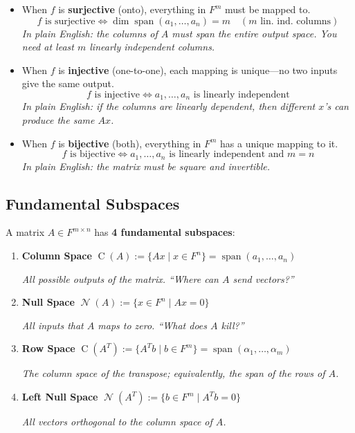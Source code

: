 \documentclass[11pt]{article}
\theoremstyle{definition}
\theoremstyle{plain}
\theoremstyle{remark}
\DeclareMathOperator{\spn}{span}
\DeclareMathOperator{\Null}{\mathcal{N}}
\DeclareMathOperator{\Col}{C}
\begin{document}
\begin{itemize}
  \item When $f$ is \textbf{surjective} (onto), everything in $F^m$ must be mapped to.
  \[
  f \text{ is surjective} \iff \dim \spn(a_1, \ldots, a_n) = m \quad (m \text{ lin.\ ind.\ columns})
  \]
  \textit{In plain English: the columns of $A$ must span the entire output space. You need at least $m$ linearly independent columns.}
  \item When $f$ is \textbf{injective} (one-to-one), each mapping is unique---no two inputs give the same output.
  \[
  f \text{ is injective} \iff a_1, \ldots, a_n \text{ is linearly independent}
  \]
  \textit{In plain English: if the columns are linearly dependent, then different $x$'s can produce the same $Ax$.}
  \item When $f$ is \textbf{bijective} (both), everything in $F^m$ has a unique mapping to it.
  \[
  f \text{ is bijective} \iff a_1, \ldots, a_n \text{ is linearly independent and } m = n
  \]
  \textit{In plain English: the matrix must be square and invertible.}
\end{itemize}

\subsection{Fundamental Subspaces}

A matrix $A \in F^{m \times n}$ has \textbf{4 fundamental subspaces}:
\begin{enumerate}
  \item \textbf{Column Space} \quad $\Col(A) := \{Ax \mid x \in F^n\} = \spn(a_1, \ldots, a_n)$

  \textit{All possible outputs of the matrix. ``Where can $A$ send vectors?''}

  \item \textbf{Null Space} \quad $\Null(A) := \{x \in F^n \mid Ax = 0\}$

  \textit{All inputs that $A$ maps to zero. ``What does $A$ kill?''}

  \item \textbf{Row Space} \quad $\Col(A^T) := \{A^T b \mid b \in F^m\} = \spn(\alpha_1, \ldots, \alpha_m)$

  \textit{The column space of the transpose; equivalently, the span of the rows of $A$.}

  \item \textbf{Left Null Space} \quad $\Null(A^T) := \{b \in F^m \mid A^T b = 0\}$

  \textit{All vectors orthogonal to the column space of $A$.}
\end{enumerate}
\end{document}
